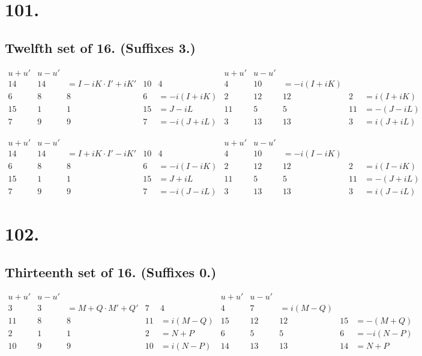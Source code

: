 \documentclass[11pt,a4paper]{article}
\begin{document}
\newpage
\section*{101.}
\label{sec:101}

\subsection*{Twelfth set of 16. (Suffixes 3.)}

\[
\begin{array}{c|cccc|c|cccc}
u+u' & u-u' & & & & u+u' & u-u' & & & \\
\hline
14 & 14 & = I-iK \cdot I'+iK' & 10 & 4 & 4 & 10 & = -i(I+iK) \\
6 & 8 & 8 & 6 & = -i(I+iK) & 2 & 12 & 12 & 2 & = i(I+iK) \\
15 & 1 & 1 & 15 & = J-iL & 11 & 5 & 5 & 11 & = -(J-iL) \\
7 & 9 & 9 & 7 & = -i(J+iL) & 3 & 13 & 13 & 3 & = i(J+iL)
\end{array}
\]

\[
\begin{array}{c|cccc|c|cccc}
u+u' & u-u' & & & & u+u' & u-u' & & & \\
\hline
14 & 14 & = I+iK \cdot I'-iK' & 10 & 4 & 4 & 10 & = -i(I-iK) \\
6 & 8 & 8 & 6 & = -i(I-iK) & 2 & 12 & 12 & 2 & = i(I-iK) \\
15 & 1 & 1 & 15 & = J+iL & 11 & 5 & 5 & 11 & = -(J+iL) \\
7 & 9 & 9 & 7 & = -i(J-iL) & 3 & 13 & 13 & 3 & = i(J-iL)
\end{array}
\]

\newpage
\section*{102.}
\label{sec:102}

\subsection*{Thirteenth set of 16. (Suffixes 0.)}

\[
\begin{array}{c|cccc|c|cccc}
u+u' & u-u' & & & & u+u' & u-u' & & & \\
\hline
3 & 3 & = M+Q \cdot M'+Q' & 7 & 4 & 4 & 7 & = i(M-Q) \\
11 & 8 & 8 & 11 & = i(M-Q) & 15 & 12 & 12 & 15 & = -(M+Q) \\
2 & 1 & 1 & 2 & = N+P & 6 & 5 & 5 & 6 & = -i(N-P) \\
10 & 9 & 9 & 10 & = i(N-P) & 14 & 13 & 13 & 14 & = N+P
\end{array}
\]
\end{document}
